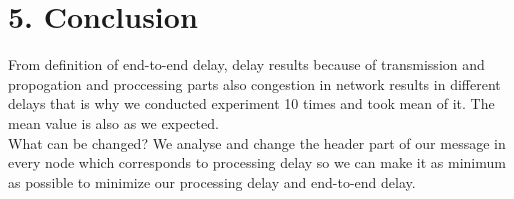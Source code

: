 \documentclass[12pt]{article}
\begin{document}
\section*{5. Conclusion}
From definition of end-to-end delay, delay results because of transmission and propogation and proccessing parts also congestion in network results in different delays that is why we conducted experiment 10 times and took mean of it. The mean value is also as we expected. 
\\What can be changed? We analyse and change the header part of our message in every node which corresponds to processing delay so we can make it as minimum as possible to minimize our processing delay and end-to-end delay.
\end{document}
